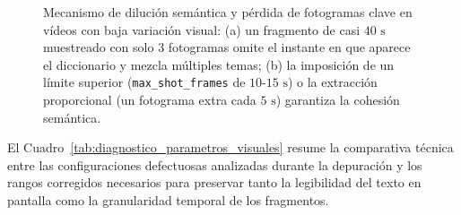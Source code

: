 \begin{figure}[htbp]
\caption{Mecanismo de dilución semántica y pérdida de fotogramas clave en vídeos con baja variación visual: (a) un fragmento de casi $40\text{ s}$ muestreado con solo $3$ fotogramas omite el instante en que aparece el diccionario y mezcla múltiples temas; (b) la imposición de un límite superior (\texttt{max\_shot\_frames} de $10\text{-}15\text{ s}$) o la extracción proporcional (un fotograma extra cada $5\text{ s}$) garantiza la cohesión semántica.} %
\label{fig:dilucion_semantica_chunks_largos}
\end{figure}

El Cuadro~\ref{tab:diagnostico_parametros_visuales} resume la comparativa técnica entre las configuraciones defectuosas analizadas durante la depuración y los rangos corregidos necesarios para preservar tanto la legibilidad del texto en pantalla como la granularidad temporal de los fragmentos. %

